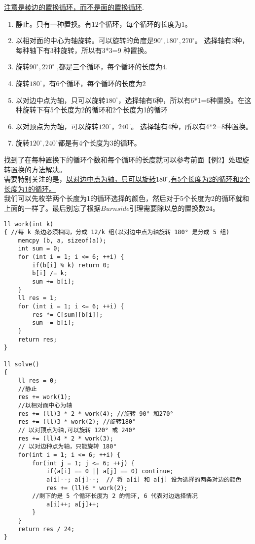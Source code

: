 \underline{注意是棱边的置换循环，而不是面的置换循环}.\\
\begin{enumerate}
\item 静止。只有一种置换。有$12$个循环，每个循环的长度为$1$。
\item 以相对面的中心为轴旋转。可以旋转的角度是$90^{\circ},180^{\circ},270^{\circ}$。 选择轴有3种，每种轴下有3种旋转，所以有3*3=9 种置换。
\item 旋转$90^{\circ},270^{\circ}$ ,都是三个循环，每个循环的长度为$4$.
\item 旋转$180^{\circ}$，有6个循环，每个循环的长度为2
\item 以对边中点为轴，只可以旋转$180^{\circ}$，选择轴有6种，所以有6*1=6种置换。在这种旋转下有5个长度为2的循环和2个长度为1的循环
\item 以对顶点为为轴，可以旋转$120^{\circ}，240^{\circ}$。 选择轴有4种，所以有4*2=8种置换。
\item 旋转$120^{\circ},240^{\circ}$都是有4个长度为3的循环。
\end{enumerate}
找到了在每种置换下的循环个数和每个循环的长度就可以参考前面【例2】处理旋转置换的方法解决。 \\
需要特别关注的是，\underline {以对边中点为轴，只可以旋转$180^{\circ}$,有5个长度为2的循环和2个长度为1的循环。} \\
我们可以先枚举两个长度为1的循环选择的颜色，然后对于5个长度为2的循环就和上面的一样了。最后别忘了根据$Burnside$引理需要除以总的置换数$24$。

\begin{lstlisting}
ll work(int k)
{ //每 k 条边必须相同，分成 12/k 组(以对边中点为轴旋转 180° 是分成 5 组)
	memcpy (b, a, sizeof(a));
	int sum = 0;
	for (int i = 1; i <= 6; ++i) {
		if(b[i] % k) return 0;
		b[i] /= k;
		sum += b[i];
	}
	ll res = 1;
	for (int i = 1; i <= 6; ++i) {
		res *= C[sum][b[i]];
		sum -= b[i];
	}
	return res;
}

ll solve()
{
	ll res = 0;
	//静止
	res += work(1);
	//以相对面中心为轴
	res += (ll)3 * 2 * work(4); //旋转 90° 和270°
	res += (ll)3 * work(2); //旋转180°
	// 以对顶点为轴,可以旋转 120° 或 240°
	res += (ll)4 * 2 * work(3);
	// 以对边种点为轴，只能旋转 180°
	for(int i = 1; i <= 6; ++i) {
		for(int j = 1; j <= 6; ++j) {
			if(a[i] == 0 || a[j] == 0) continue;
			a[i]--; a[j]--;  // 将 a[i] 和 a[j] 设为选择的两条对边的颜色
			res += (ll)6 * work(2);
        //剩下的是 5 个循环长度为 2 的循环, 6 代表对边选择情况
			a[i]++; a[j]++;
		}
	}
	return res / 24;
}
\end{lstlisting}

